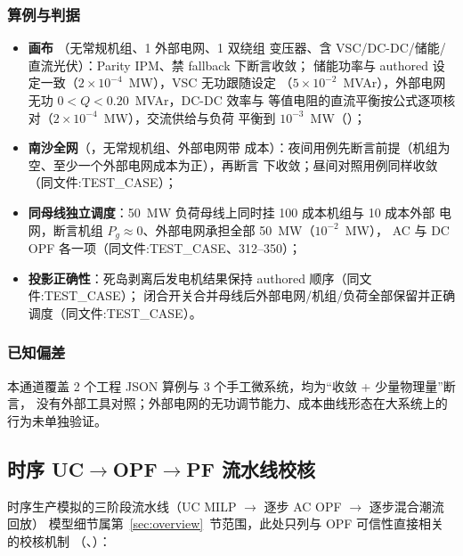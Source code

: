 \subsubsection*{算例与判据}
\begin{itemize}
  \item \textbf{画布 }（无常规机组、1 外部电网、1 双绕组
        变压器、含 VSC/DC-DC/储能/直流光伏）：Parity IPM、禁 fallback 下断言收敛；
        储能功率与 authored 设定一致（$2\times10^{-4}$~MW），VSC 无功跟随设定
        （$5\times10^{-2}$~MVAr），外部电网无功 $0<Q<0.20$~MVAr，DC-DC 效率与
        等值电阻的直流平衡按公式逐项核对（$2\times10^{-4}$~MW），交流供给与负荷
        平衡到 $10^{-3}$~MW（）；
  \item \textbf{南沙全网}（，无常规机组、外部电网带
        成本）：夜间用例先断言前提（机组为空、至少一个外部电网成本为正），再断言
         下收敛；昼间对照用例同样收敛（同文件:TEST\_CASE）；
  \item \textbf{同母线独立调度}：50~MW 负荷母线上同时挂 100 成本机组与 10 成本外部
        电网，断言机组 $P_g\approx0$、外部电网承担全部 50~MW（$10^{-2}$~MW），
        AC 与 DC OPF 各一项（同文件:TEST\_CASE、312--350）；
  \item \textbf{投影正确性}：死岛剥离后发电机结果保持 authored 顺序（同文件:TEST\_CASE）；
        闭合开关合并母线后外部电网/机组/负荷全部保留并正确调度（同文件:TEST\_CASE）。
\end{itemize}

\subsubsection*{已知偏差}
本通道覆盖 2 个工程 JSON 算例与 3 个手工微系统，均为“收敛 + 少量物理量”断言，
没有外部工具对照；外部电网的无功调节能力、成本曲线形态在大系统上的行为未单独验证。

\subsection{时序 UC$\to$OPF$\to$PF 流水线校核}\label{subsec:ver:tspf}

时序生产模拟的三阶段流水线（UC MILP $\to$ 逐步 AC OPF $\to$ 逐步混合潮流回放）
模型细节属第~\ref{sec:overview}~节范围，此处只列与 OPF 可信性直接相关的校核机制
（、）：

